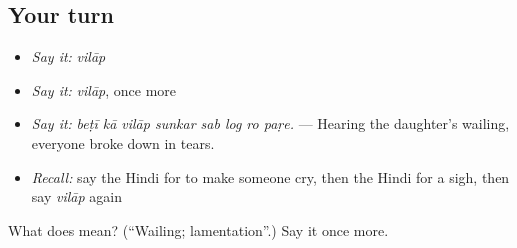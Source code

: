 \subsection*{Your turn}
\begin{itemize}
\raggedright
  \item \emph{Say it:} \emph{vilāp}
  \item \emph{Say it:} \emph{vilāp}, once more
  \item \emph{Say it:} \emph{beṭī kā vilāp sunkar sab log ro paṛe.} — Hearing the daughter's wailing, everyone broke down in tears.
  \item \emph{Recall:} say the Hindi for to make someone cry, then the Hindi for a sigh, then say \emph{vilāp} again
\end{itemize}

\begin{tcolorbox}[breakable,colback=teal!4,colframe=teal!35!black,title={Before you move on}]
What does  mean? (\textquotedblleft{}Wailing; lamentation\textquotedblright{}.) Say it once more.
\end{tcolorbox}
